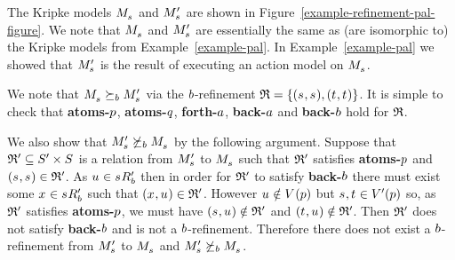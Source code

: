 \begin{example}
\begin{figure}
\end{figure}

The Kripke models $\kPModel{\kStateS}$ and $\kPModelP{\kStateS}$ are shown in Figure~\ref{example-refinement-pal-figure}.
We note that $\kPModel{\kStateS}$ and $\kPModelP{\kStateS}$ are essentially the same as (are isomorphic to) the Kripke models from Example~\ref{example-pal}.
In Example~\ref{example-pal} we showed that $\kPModelP{\kStateS}$ is the result of executing an action model on $\kPModel{\kStateS}$.

We note that $\kPModel{\kStateS} \simulatesB \kPModelP{\kStateS}$ via the $b$-refinement $\refinement = \{(\kStateS, \kStateS), (\kStateT, \kStateT)\}$.
It is simple to check that {\bf atoms-$p$}, {\bf atoms-$q$}, {\bf forth-$a$}, {\bf back-$a$} and {\bf back-$b$} hold for $\mathfrak{R}$.

We also show that $\kPModelP{\kStateS} \not\simulatesB \kPModel{\kStateS}$ by the following argument.
Suppose that $\refinement' \subseteq \kStatesP \times \kStates$ is a relation from $\kPModelP{\kStateS}$ to $\kPModel{\kStateS}$ such that $\mathfrak{R}'$ satisfies {\bf atoms-$p$} and $(\kStateS, \kStateS) \in \refinement'$.
As $\kStateU \in \kSuccessorsPB{\kStateS}$ then in order for $\mathfrak{R}'$ to satisfy {\bf back-$b$} there must exist some $\kStateX \in \kSuccessorsPB{\kStateS}$ such that $(\kStateX, \kStateU) \in \refinement'$.
However $\kStateU \notin \kValuation(\atomP)$ but $\kStateS, \kStateT \in \kValuationP(\atomP)$ so, as $\mathfrak{R}'$ satisfies {\bf atoms-$p$}, we must have $(\kStateS, \kStateU) \notin \refinement'$ and $(\kStateT, \kStateU) \notin \refinement'$.
Then $\mathfrak{R}'$ does not satisfy {\bf back-$b$} and is not a $b$-refinement.
Therefore there does not exist a $b$-refinement from $\kPModelP{\kStateS}$ to $\kPModel{\kStateS}$ and $\kPModelP{\kStateS} \not\simulatesB \kPModel{\kStateS}$.
\end{example}

